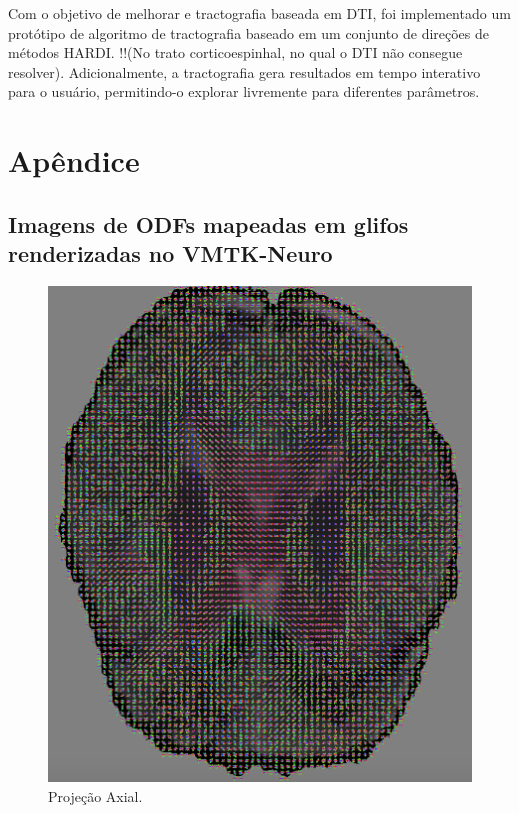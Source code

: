\documentclass[
    12pt,                %
    oneside,            %
    a4paper,            %
    english,            %
    french,                %
    spanish,            %
    brazil                %
    ]{abntex2}
\begin{document}
Com o objetivo de melhorar e tractografia baseada em DTI, foi implementado um protótipo de algoritmo de tractografia baseado em um conjunto de direções de métodos HARDI. !!(No trato corticoespinhal, no qual o DTI não consegue resolver).
Adicionalmente, a tractografia gera resultados em tempo interativo para o usuário, permitindo-o explorar livremente para diferentes parâmetros.

\pagebreak
\chapter{Apêndice}


\section{Imagens de ODFs mapeadas em glifos renderizadas no VMTK-Neuro}

\label{section::QBall_Glifos}

\begin{figure}[H]
\label{fig::QBall_glifos_axial}
    \centering
    \includegraphics[width=1.0\linewidth, angle=0]{figs/Exemplos_QBall_visualizacao/Axial.png}
     \caption{Projeção Axial.}
\end{figure}
\end{document}
